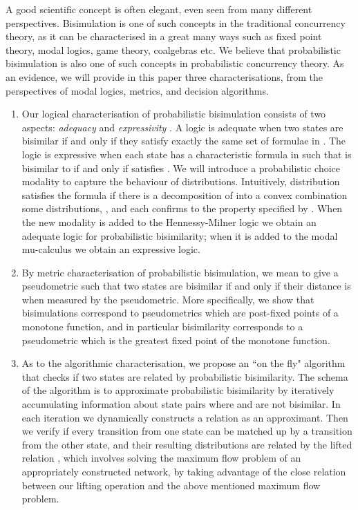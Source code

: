 \documentclass{article}
\begin{document}
A good scientific concept is often elegant, even seen from many
different perspectives. Bisimulation is one of such concepts in the
traditional concurrency theory, as it can be characterised in a
great many ways such as fixed point theory, modal logics, game
theory, coalgebras etc. We believe that probabilistic bisimulation
is also one of such concepts in probabilistic concurrency theory. As
an evidence, we will provide in this paper three characterisations,
from the perspectives of modal logics, metrics, and decision
algorithms.
\begin{enumerate}
\item Our logical characterisation of probabilistic bisimulation
consists of two aspects: \emph{adequacy} and \emph{expressivity}
\cite{Pnu85}. A logic  is adequate when two states are
 bisimilar if and only if they satisfy exactly the same
set of formulae in . The logic is expressive when each state
 has a characteristic formula  in  such that  is
bisimilar to  if and only if  satisfies . We will
introduce a probabilistic choice modality  to capture the behaviour
of distributions. Intuitively, distribution  satisfies the
formula  if there is a
decomposition of  into a convex combination some
distributions, , and each
 confirms to the property specified by . When the
new modality is added to the Hennessy-Milner logic \cite{HM85} we
obtain an adequate logic for probabilistic bisimilarity; when it is
added to the modal mu-calculus \cite{Koz83} we obtain an expressive
logic.

\item By metric characterisation of probabilistic bisimulation, we
mean to give a pseudometric such that two states are bisimilar if
and only if their distance is  when measured by the pseudometric.
More specifically, we show that bisimulations correspond to
pseudometrics which are post-fixed points of a monotone function,
and in particular bisimilarity corresponds to a pseudometric which
is the greatest fixed point of the monotone function.

\item As to the algorithmic characterisation, we propose an ``on the
fly" algorithm that checks if two states are related by
probabilistic bisimilarity. The schema of the algorithm is to
approximate probabilistic bisimilarity by iteratively accumulating
information about state pairs  where  and  are not
bisimilar. In each iteration we dynamically constructs a relation
 as an approximant. Then we verify if every transition from
one state can be matched up by a transition from the other state,
and their resulting distributions are related by the lifted relation
, which involves solving the maximum flow problem of
an appropriately constructed network, by taking advantage of the
close relation between our lifting operation and the above mentioned
maximum flow problem.
\end{enumerate}
\end{document}
